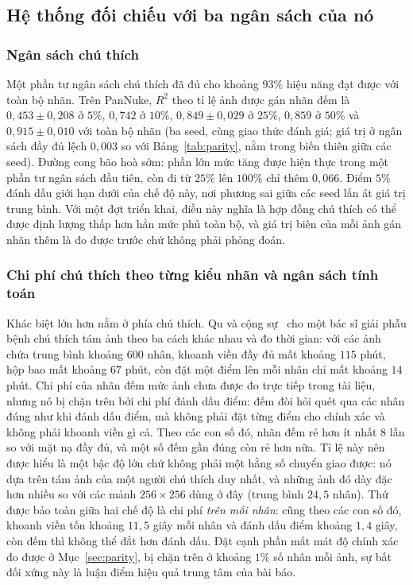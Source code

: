 \documentclass[preprint,12pt]{elsarticle}
\begin{document}
\subsection{Hệ thống đối chiếu với ba ngân sách của nó}\label{sec:deploy}
\subsubsection{Ngân sách chú thích}\label{sec:label}
Một phần tư ngân sách chú thích đã đủ cho khoảng $93\%$ hiệu năng đạt được với toàn bộ nhãn. Trên PanNuke, $R^2$
theo tỉ lệ ảnh được gán nhãn đếm là $0{,}453 \pm 0{,}208$ ở $5\%$, $0{,}742$ ở $10\%$, $0{,}849 \pm 0{,}029$ ở
$25\%$, $0{,}859$ ở $50\%$ và $0{,}915 \pm 0{,}010$ với toàn bộ nhãn (ba seed, cùng giao thức đánh giá; giá trị ở
ngân sách đầy đủ lệch $0{,}003$ so với Bảng~\ref{tab:parity}, nằm trong biến thiên giữa các seed). Đường cong bão
hoà sớm: phần lớn mức tăng được hiện thực trong một phần tư ngân sách đầu tiên, còn đi từ $25\%$ lên $100\%$ chỉ
thêm $0{,}066$. Điểm $5\%$ đánh dấu giới hạn dưới của chế độ này, nơi phương sai giữa các seed lấn át giá trị
trung bình. Với một đợt triển khai, điều này nghĩa là hợp đồng chú thích có thể được định lượng thấp hơn hẳn mức
phủ toàn bộ, và giá trị biên của mỗi ảnh gán nhãn thêm là đo được trước chứ không phải phỏng đoán.

\subsubsection{Chi phí chú thích theo từng kiểu nhãn và ngân sách tính toán}\label{sec:cost}
Khác biệt lớn hơn nằm ở phía chú thích. Qu và cộng sự~\cite{qu2020} cho một bác sĩ giải phẫu bệnh chú thích tám
ảnh theo ba cách khác nhau và đo thời gian: với các ảnh chứa trung bình khoảng $600$ nhân, khoanh viền đầy đủ mất
khoảng $115$ phút, hộp bao mất khoảng $67$ phút, còn đặt một điểm lên mỗi nhân chỉ mất khoảng $14$ phút. Chi phí
của nhãn đếm mức ảnh chưa được đo trực tiếp trong tài liệu, nhưng nó bị chặn trên bởi chi phí đánh dấu điểm: đếm
đòi hỏi quét qua các nhân đúng như khi đánh dấu điểm, mà không phải đặt từng điểm cho chính xác và không phải
khoanh viền gì cả. Theo các con số đó, nhãn đếm rẻ hơn ít nhất $8$ lần so với mặt nạ đầy đủ, và một số đếm gần
đúng còn rẻ hơn nữa. Tỉ lệ này nên được hiểu là một bậc độ lớn chứ không phải một hằng số chuyển giao được: nó dựa
trên tám ảnh của một người chú thích duy nhất, và những ảnh đó dày đặc hơn nhiều so với các mảnh $256\times256$
dùng ở đây (trung bình $24{,}5$ nhân). Thứ được bảo toàn giữa hai chế độ là chi phí \emph{trên mỗi nhân}: cũng
theo các con số đó, khoanh viền tốn khoảng $11{,}5$ giây mỗi nhân và đánh dấu điểm khoảng $1{,}4$ giây, còn đếm
thì không thể đắt hơn đánh dấu. Đặt cạnh phần mất mát độ chính xác đo được ở Mục~\ref{sec:parity}, bị chặn trên ở
khoảng $1\%$ số nhân mỗi ảnh, sự bất đối xứng này là luận điểm hiệu quả trung tâm của bài báo.
\end{document}
